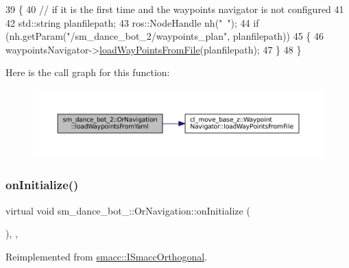 \begin{DoxyCode}
39     \{
40         \textcolor{comment}{// if it is the first time and the waypoints navigator is not configured}
41 
42         std::string planfilepath;
43         ros::NodeHandle nh(\textcolor{stringliteral}{"~"});
44         \textcolor{keywordflow}{if} (nh.getParam(\textcolor{stringliteral}{"/sm\_dance\_bot\_2/waypoints\_plan"}, planfilepath))
45         \{
46             waypointsNavigator->\hyperlink{classcl__move__base__z_1_1WaypointNavigator_a18d74467ddf0e637a8d5a6e1fa2e93db}{loadWayPointsFromFile}(planfilepath);
47         \}
48     \}
\end{DoxyCode}
Here is the call graph for this function\+:
\nopagebreak
\begin{figure}[H]
\begin{center}
\leavevmode
\includegraphics[width=350pt]{classsm__dance__bot__2_1_1OrNavigation_a663fc206de1964058c851f521279ca34_cgraph}
\end{center}
\end{figure}
\mbox{\label{classsm__dance__bot__2_1_1OrNavigation_acc491d801e0abacd9d152e048e77fab6}} 
\subsubsection{\texorpdfstring{on\+Initialize()}{onInitialize()}}
{\footnotesize\ttfamily virtual void sm\+\_\+dance\+\_\+bot\+\_\+::\+Or\+Navigation\+::on\+Initialize (\begin{DoxyParamCaption}{ }\end{DoxyParamCaption})\hspace{0.3cm}{\ttfamily [inline]}, {\ttfamily [override]}, {\ttfamily [virtual]}}



Reimplemented from \hyperlink{classsmacc_1_1ISmaccOrthogonal_a6bb31c620cb64dd7b8417f8705c79c7a}{smacc\+::\+I\+Smacc\+Orthogonal}.




